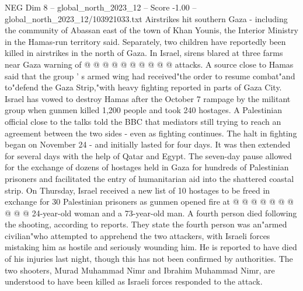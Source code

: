 \begin{textsample}{NEG Dim 8 – global\_north\_2023\_12 – Score -1.00 – global\_north\_2023\_12/103921033.txt}
Airstrikes hit southern Gaza - including the community of Abassan east of the town of Khan Younis, the Interior Ministry in the Hamas-run territory said.
Separately, two children have reportedly been killed in airstrikes in the north of Gaza.
In Israel, sirens blared at three farms near Gaza warning of @ @ @ @ @ @ @ @ @ @ attacks.
A source close to Hamas said that the group ' s armed wing had received"the order to resume combat"and to"defend the Gaza Strip,"with heavy fighting reported in parts of Gaza City.
Israel has vowed to destroy Hamas after the October 7 rampage by the militant group when gunmen killed 1,200 people and took 240 hostages.
A Palestinian official close to the talks told the BBC that mediators still trying to reach an agreement between the two sides - even as fighting continues.
The halt in fighting began on November 24 - and initially lasted for four days.
It was then extended for several days with the help of Qatar and Egypt.
The seven-day pause allowed for the exchange of dozens of hostages held in Gaza for hundreds of Palestinian prisoners and facilitated the entry of humanitarian aid into the shattered coastal strip.
On Thursday, Israel received a new list of 10 hostages to be freed in exchange for 30 Palestinian prisoners as gunmen opened fire at @ @ @ @ @ @ @ @ @ @ 24-year-old woman and a 73-year-old man.
A fourth person died following the shooting, according to reports.
They state the fourth person was an"armed civilian"who attempted to apprehend the two attackers, with Israeli forces mistaking him as hostile and seriously wounding him.
He is reported to have died of his injuries last night, though this has not been confirmed by authorities.
The two shooters, Murad Muhammad Nimr and Ibrahim Muhammad Nimr, are understood to have been killed as Israeli forces responded to the attack.

\end{textsample}
